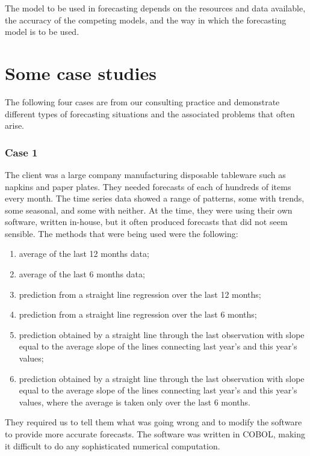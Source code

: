 \documentclass[]{book}
\providecommand{\tightlist}{%
  \setlength{\itemsep}{0pt}\setlength{\parskip}{0pt}}
\begin{document}
The model to be used in forecasting depends on the resources and data available, the accuracy of the competing models, and the way in which the forecasting model is to be used.

\hypertarget{case-studies}{%
\section{Some case studies}\label{case-studies}}

The following four cases are from our consulting practice and demonstrate different types of forecasting situations and the associated problems that often arise.

\hypertarget{case-1}{%
\subsubsection*{Case 1}\label{case-1}}

The client was a large company manufacturing disposable tableware such as napkins and paper plates. They needed forecasts of each of hundreds of items every month. The time series data showed a range of patterns, some with trends, some seasonal, and some with neither. At the time, they were using their own software, written in-house, but it often produced forecasts that did not seem sensible. The methods that were being used were the following:

\begin{enumerate}
\def\labelenumi{\arabic{enumi}.}
\tightlist
\item
  average of the last 12 months data;
\item
  average of the last 6 months data;
\item
  prediction from a straight line regression over the last 12 months;
\item
  prediction from a straight line regression over the last 6 months;
\item
  prediction obtained by a straight line through the last observation with slope equal to the average slope of the lines connecting last year's and this year's values;
\item
  prediction obtained by a straight line through the last observation with slope equal to the average slope of the lines connecting last year's and this year's values, where the average is taken only over the last 6 months.
\end{enumerate}

They required us to tell them what was going wrong and to modify the software to provide more accurate forecasts. The software was written in COBOL, making it difficult to do any sophisticated numerical computation.
\end{document}

